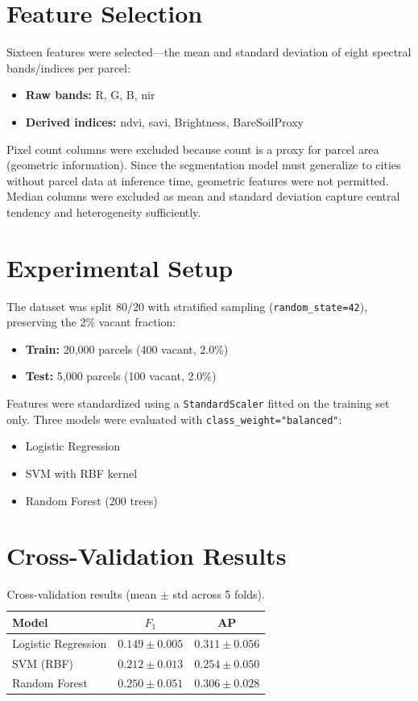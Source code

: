 \section{Feature Selection}

Sixteen features were selected---the mean and standard deviation of eight spectral bands/indices per parcel:
\begin{itemize}
  \item \textbf{Raw bands:} R, G, B, \acrshort{nir}
  \item \textbf{Derived indices:} \acrshort{ndvi}, \acrshort{savi}, Brightness, BareSoilProxy
\end{itemize}

Pixel count columns were excluded because count is a proxy for parcel area (geometric information). Since the segmentation model must generalize to cities without parcel data at inference time, geometric features were not permitted. Median columns were excluded as mean and standard deviation capture central tendency and heterogeneity sufficiently.

\section{Experimental Setup}

The dataset was split 80/20 with stratified sampling (\texttt{random\_state=42}), preserving the 2\% vacant fraction:
\begin{itemize}
  \item \textbf{Train:} 20,000 parcels (400 vacant, 2.0\%)
  \item \textbf{Test:} 5,000 parcels (100 vacant, 2.0\%)
\end{itemize}

Features were standardized using a \texttt{StandardScaler} fitted on the training set only. Three models were evaluated with \texttt{class\_weight="balanced"}:
\begin{itemize}
  \item Logistic Regression
  \item SVM with RBF kernel
  \item Random Forest (200 trees)
\end{itemize}

\section{Cross-Validation Results}

\begin{table}[htbp]
  \centering
  \caption{Cross-validation results (mean $\pm$ std across 5 folds).}
  \label{tab:cv_results}
  \begin{tabular}{lcc}
    \toprule
    \textbf{Model} & \textbf{$F_1$} & \textbf{AP} \\
    \midrule
    Logistic Regression & $0.149 \pm 0.005$ & $0.311 \pm 0.056$ \\
    SVM (RBF) & $0.212 \pm 0.013$ & $0.254 \pm 0.050$ \\
    Random Forest & $0.250 \pm 0.051$ & $0.306 \pm 0.028$ \\
    \bottomrule
  \end{tabular}
\end{table}

